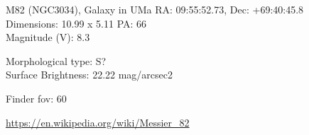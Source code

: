 \begin{block}{M82 (NGC3034), Galaxy in UMa}
    RA: 09:55:52.73, Dec: +69:40:45.8 \\ 
    Dimensions: 10.99 x 5.11 PA: 66 \\ 
    Magnitude (V): 8.3

    Morphological type: S? \\ 
    Surface Brightness: 22.22 mag/arcsec2 


    Finder fov: 60 

    \url{https://en.wikipedia.org/wiki/Messier_82} 
\end{block}